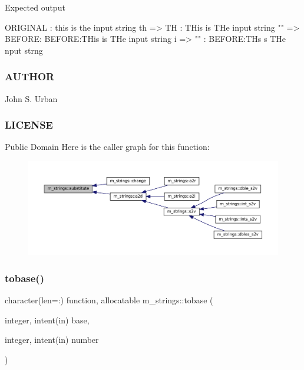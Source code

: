 Expected output \begin{DoxyVerb} ORIGINAL    : this is the input string
 th => TH    : THis is THe input string
 "" => BEFORE: BEFORE:THis is THe input string
 i => ""     : BEFORE:THs s THe nput strng
\end{DoxyVerb}
 \subsubsection*{A\+U\+T\+H\+OR}

John S. Urban \subsubsection*{L\+I\+C\+E\+N\+SE}

Public Domain Here is the caller graph for this function\+:\nopagebreak
\begin{figure}[H]
\begin{center}
\leavevmode
\includegraphics[width=350pt]{namespacem__strings_ab84a4b7c2be211433c2d1b435a87fa32_icgraph}
\end{center}
\end{figure}
\mbox{\label{namespacem__strings_aa896d221112afb3dbc90eeca6075b282}} 
\subsubsection{\texorpdfstring{tobase()}{tobase()}}
{\footnotesize\ttfamily character(len=\+:) function, allocatable m\+\_\+strings\+::tobase (\begin{DoxyParamCaption}\item[{integer, intent(in)}]{base,  }\item[{integer, intent(in)}]{number }\end{DoxyParamCaption})\hspace{0.3cm}{\ttfamily [private]}}



